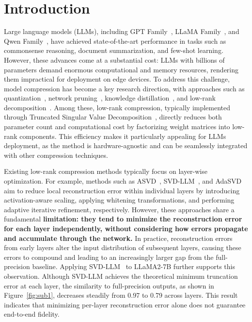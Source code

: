 \vspace{-0.2cm}
\section{Introduction}
Large language models (LLMs), including GPT Family~\citep{achiam2023gpt,dettmers2022gpt3}, LLaMA Family~\citep{touvron2023llama,touvron2023llama2,dubey2024llama3}, and Qwen Family~\citep{bai2023qwen,team2024qwen2,yang2025qwen3}, have achieved state-of-the-art performance in tasks such as commonsense reasoning, document summarization, and few-shot learning. However, these advances come at a substantial cost: LLMs with billions of parameters demand enormous computational and memory resources, rendering them impractical for deployment on edge devices.
To address this challenge, model compression has become a key research direction, with approaches such as quantization~\citep{frantar2022gptq,hu2025ostquant}, network pruning~\citep{ashkboos2024slicegpt}, knowledge distillation~\citep{hinton2015distilling}, and low-rank decomposition~\citep{yuan2023asvd,li2025adasvd}. 
Among these, low-rank compression, typically implemented through Truncated Singular Value Decomposition~\citep{Eckart1936}, directly reduces both parameter count and computational cost by factorizing weight matrices into low-rank components. This efficiency makes it particularly appealing for LLMs deployment, as the method is hardware-agnostic and can be seamlessly integrated with other compression techniques.




Existing low-rank compression methods typically focus on layer-wise optimization. For example, methods such as ASVD~\citep{yuan2023asvd}, SVD-LLM~\citep{Wang2024SVD-LLM}, and AdaSVD~\citep{li2025adasvd} aim to reduce local reconstruction error within individual layers by introducing activation-aware scaling, applying whitening transformations, and performing adaptive iterative refinement, respectively.
However, these approaches share a fundamental \textbf{limitation: they tend to minimize the reconstruction error for each layer independently, without considering how errors propagate and accumulate through the network.} In practice, reconstruction errors from early layers alter the input distribution of subsequent layers, causing these errors to compound and leading to an increasingly larger gap from the full-precision baseline.
Applying SVD-LLM~\citep{Wang2024SVD-LLM} to LLaMA2-7B further supports this observation. Although SVD-LLM achieves the theoretical minimum truncation error at each layer, the similarity to full-precision outputs, as shown in Figure~\ref{fig:sub1}, decreases steadily from 0.97 to 0.79 across layers. This result indicates that minimizing per-layer reconstruction error alone does not guarantee end-to-end fidelity.

